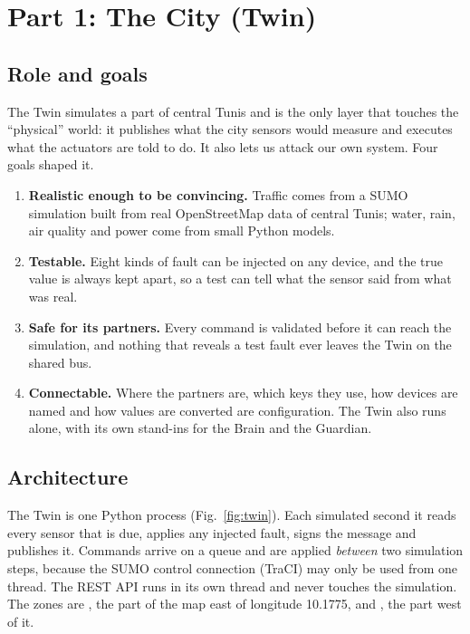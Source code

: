 \section{Part 1: The City (Twin)}
\subsection{Role and goals}
The Twin simulates a part of central Tunis and is the only layer that touches the ``physical'' world: it publishes what the
city sensors would measure and executes what the actuators are told to do. It also lets us attack our own system. Four goals
shaped it.

\begin{enumerate}
\item \textbf{Realistic enough to be convincing.} Traffic comes from a SUMO simulation built from real OpenStreetMap data of
central Tunis; water, rain, air quality and power come from small Python models.
\item \textbf{Testable.} Eight kinds of fault can be injected on any device, and the true value is always kept apart, so a test can
tell what the sensor said from what was real.
\item \textbf{Safe for its partners.} Every command is validated before it can reach the simulation, and nothing that reveals a
test fault ever leaves the Twin on the shared bus.
\item \textbf{Connectable.} Where the partners are, which keys they use, how devices are named and how values are converted
are configuration. The Twin also runs alone, with its own stand-ins for the Brain and the Guardian.
\end{enumerate}

\subsection{Architecture}
The Twin is one Python process (Fig.~\ref{fig:twin}). Each simulated second it reads every sensor that is due, applies
any injected fault, signs the message and publishes it. Commands arrive on a queue and are applied \emph{between} two
simulation steps, because the SUMO control connection (TraCI) may only be used from one thread. The REST API runs in its own
thread and never touches the simulation. The zones are , the part of the map east of longitude 10.1775, and , the part west of it.

